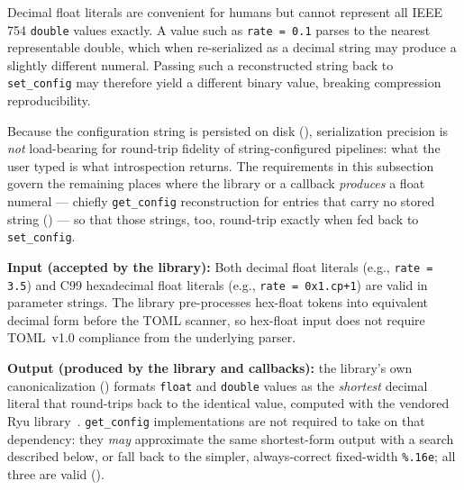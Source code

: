 \documentclass[../RFC-HDFG-2026-001.tex]{subfiles}
\begin{document}
\label{sec:float-precision}

Decimal float literals are convenient for humans but cannot represent all
IEEE\,754 \texttt{double} values exactly.  A value such as \texttt{rate = 0.1}
parses to the nearest representable double, which when re-serialized as a
decimal string may produce a slightly different numeral.  Passing such a
reconstructed string back to \texttt{set\_config} may therefore yield a
different binary value, breaking compression reproducibility.

Because the configuration string is persisted on disk
(), serialization precision is \emph{not}
load-bearing for round-trip fidelity of string-configured pipelines: what
the user typed is what introspection returns.  The requirements in this
subsection govern the remaining places where the library or a callback
\emph{produces} a float numeral --- chiefly \texttt{get\_config}
reconstruction for entries that carry no stored string
() --- so that those strings, too, round-trip
exactly when fed back to \texttt{set\_config}.

\textbf{Input (accepted by the library):} Both decimal float literals
(e.g., \texttt{rate = 3.5}) and C99 hexadecimal float literals
(e.g., \texttt{rate = 0x1.cp+1}) are valid in parameter strings.
The library pre-processes hex-float tokens into equivalent decimal form
before the TOML scanner, so hex-float input does not require TOML~v1.0
compliance from the underlying parser.

\textbf{Output (produced by the library and callbacks):} the library's own
canonicalization () formats
\texttt{float} and \texttt{double} values as the \emph{shortest} decimal
literal that round-trips back to the identical value, computed with the
vendored Ryu library~\cite{ryu,ryupaper}.  \texttt{get\_config}
implementations are not required to take on that dependency: they \emph{may}
approximate the same shortest-form output with a search described below, or
fall back to the simpler, always-correct fixed-width \texttt{\%.16e}; all
three are valid ().
\end{document}
